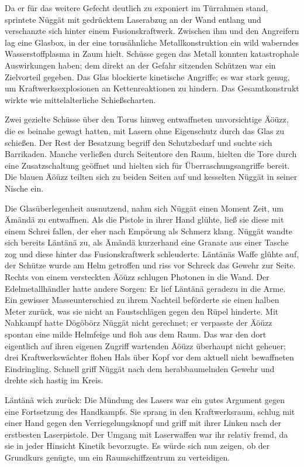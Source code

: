 Da er für das weitere Gefecht deutlich zu exponiert im Türrahmen stand, sprintete Nüggät mit gedrücktem Laserabzug an der Wand entlang und verschanzte sich hinter einem Fusionskraftwerk. Zwischen ihm und den Angreifern lag eine Glasbox, in der eine torusähnliche Metallkonstruktion ein wild waberndes Wasserstoffplasma in Zaum hielt. Schüsse gegen das Metall konnten katastrophale Auswirkungen haben; dem direkt an der Gefahr sitzenden Schützen war ein Zielvorteil gegeben. Das Glas blockierte kinetische Angriffe; es war stark genug, um Kraftwerksexplosionen an Kettenreaktionen zu hindern. Das Gesamtkonstrukt wirkte wie mittelalterliche Schießscharten.

Zwei gezielte Schüsse über den Torus hinweg entwaffneten unvorsichtige Äöüzz, die es beinahe gewagt hatten, mit Lasern ohne Eigenschutz durch das Glas zu schießen. Der Rest der Besatzung begriff den Schutzbedarf und suchte sich Barrikaden. Manche verließen durch Seitentore den Raum, hielten die Tore durch eine Zusatzschaltung geöffnet und hielten sich für Überraschungsangriffe bereit. Die blauen Äöüzz teilten sich zu beiden Seiten auf und kesselten Nüggät in seiner Nische ein.

Die Glasüberlegenheit ausnutzend, nahm sich Nüggät einen Moment Zeit, um Ämändä zu entwaffnen. Als die Pistole in ihrer Hand glühte, ließ sie diese mit einem Schrei fallen, der eher nach Empörung als Schmerz klang. Nüggät wandte sich bereits Läntänä zu, als Ämändä kurzerhand eine Granate aus einer Tasche zog und diese hinter das Fusionskraftwerk schleuderte. Läntänäs Waffe glühte auf, der Schütze wurde am Helm getroffen und riss vor Schreck das Gewehr zur Seite. Rechts von einem versteckten Äöüzz schlugen Photonen in die Wand. Der Edelmetallhändler hatte andere Sorgen: Er lief Läntänä geradezu in die Arme. Ein gewisser Masseunterschied zu ihrem Nachteil beförderte sie einen halben Meter zurück, was sie nicht an Faustschlägen gegen den Rüpel hinderte. Mit Nahkampf hatte Dögöbörz Nüggät nicht gerechnet; er verpasste der Äöüzz spontan eine milde Helmfeige und floh aus dem Raum. Das war den dort eigentlich auf ihren eigenen Zugriff wartenden Äöüzz überhaupt nicht geheuer; drei Kraftwerkswächter flohen Hals über Kopf vor dem aktuell nicht bewaffneten Eindringling. Schnell griff Nüggät nach dem herabbaumelnden Gewehr und drehte sich hastig im Kreis.

Läntänä wich zurück: Die Mündung des Lasers war ein gutes Argument gegen eine Fortsetzung des Handkampfs. Sie sprang in den Kraftwerksraum, schlug mit einer Hand gegen den Verriegelungsknopf und griff mit ihrer Linken nach der erstbesten Laserpistole. Der Umgang mit Laserwaffen war ihr relativ fremd, da sie in jeder Hinsicht Kinetik bevorzugte. Es würde sich nun zeigen, ob der Grundkurs genügte, um ein Raumschiffzentrum zu verteidigen.

